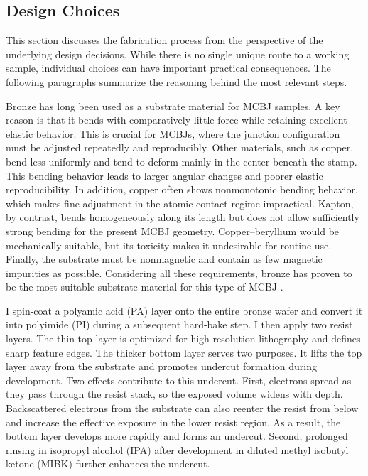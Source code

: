     \subsection{Design Choices} 
    \label{subsection:design}

        This section discusses the fabrication process from the perspective of the underlying design decisions. While there is no single unique route to a working sample, individual choices can have important practical consequences. The following paragraphs summarize the reasoning behind the most relevant steps.

        Bronze has long been used as a substrate material for MCBJ samples. A key reason is that it bends with comparatively little force while retaining excellent elastic behavior. This is crucial for MCBJs, where the junction configuration must be adjusted repeatedly and reproducibly. Other materials, such as copper, bend less uniformly and tend to deform mainly in the center beneath the stamp. This bending behavior leads to larger angular changes and poorer elastic reproducibility. In addition, copper often shows nonmonotonic bending behavior, which makes fine adjustment in the atomic contact regime impractical. Kapton, by contrast, bends homogeneously along its length but does not allow sufficiently strong bending for the present MCBJ geometry. Copper--beryllium would be mechanically suitable, but its toxicity makes it undesirable for routine use. Finally, the substrate must be nonmagnetic and contain as few magnetic impurities as possible. Considering all these requirements, bronze has proven to be the most suitable substrate material for this type of MCBJ \cite{schirm_einfluss_2009}.
        
        I spin-coat a polyamic acid (PA) layer onto the entire bronze wafer and convert it into polyimide (PI) during a subsequent hard-bake step. I then apply two resist layers. The thin top layer is optimized for high-resolution lithography and defines sharp feature edges. The thicker bottom layer serves two purposes. It lifts the top layer away from the substrate and promotes undercut formation during development. Two effects contribute to this undercut. First, electrons spread as they pass through the resist stack, so the exposed volume widens with depth. Backscattered electrons from the substrate can also reenter the resist from below and increase the effective exposure in the lower resist region. As a result, the bottom layer develops more rapidly and forms an undercut. Second, prolonged rinsing in isopropyl alcohol (IPA) after development in diluted methyl isobutyl ketone (MIBK) further enhances the undercut.

